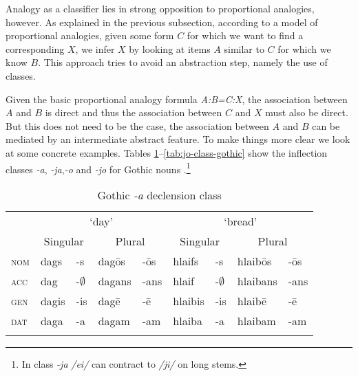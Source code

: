 Analogy as a classifier lies in strong opposition to proportional analogies, however. As explained in the previous subsection, according to a model of proportional analogies, given some form $C$ for which we want to find a corresponding $X$, we infer $X$ by looking at items $A$ similar to $C$ for which we know $B$. This approach tries to avoid an abstraction step, namely the use of classes.
 
Given the basic proportional analogy formula \textit{A:B=C:X}, the association between $A$ and $B$ is direct and thus the association between $C$ and $X$ must also be direct. But this does not need to be the case, the association between $A$ and $B$ can be mediated by an intermediate abstract feature. To make things more clear we look at some concrete examples. Tables \ref{tab:a-class-gothic}--\ref{tab:jo-class-gothic} show the inflection classes \textit{-a}, \textit{-ja},\textit{-o} and \textit{-jo} for Gothic nouns \autocite{Braune.1895}.\footnote{In class \textit{-ja} \textit{/ei/} can contract to \textit{/ji/} on long stems.}

\begin{table}[h]
    \centering
    \caption{Gothic \textit{-a} declension class}\label{tab:a-class-gothic}
    \begin{tabular}{lllllllll}
      \lsptoprule
      & \multicolumn{4}{c}{`day'} & \multicolumn{4}{c}{`bread'}\\
      & \multicolumn{2}{c}{Singular} & \multicolumn{2}{c}{Plural} & \multicolumn{2}{c}{Singular} & \multicolumn{2}{c}{Plural} \\
      \midrule

      \textsc{nom} & dags  & -s           & dagōs  & -ōs  & hlaifs  & -s           & hlaibōs  & -ōs  \\
      \textsc{acc} & dag   & -$\emptyset$ & dagans & -ans & hlaif   & -$\emptyset$ & hlaibans & -ans \\
      \textsc{gen} & dagis & -is          & dagē   & -ē   & hlaibis & -is          & hlaibē   & -ē   \\
      \textsc{dat} & daga  & -a           & dagam  & -am  & hlaiba  & -a           & hlaibam  & -am  \\
      \lspbottomrule
  \end{tabular}
\end{table}

